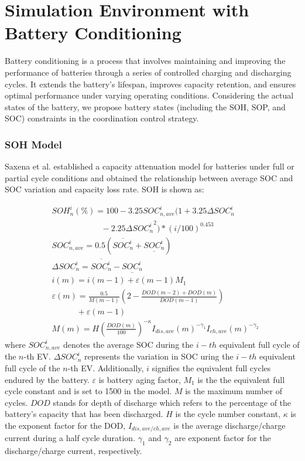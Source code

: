 \documentclass[journal,twoside]{IEEEtran}
\begin{document}
\appendices
\section{Simulation Environment with Battery Conditioning}
Battery conditioning is a process that involves maintaining and improving the performance of batteries through a series of controlled charging and discharging cycles. It extends the battery's lifespan, improves capacity retention, and ensures optimal performance under varying operating conditions. Considering the actual states of the battery, we propose battery states (including the SOH, SOP, and SOC) constraints in the coordination control strategy.
\subsubsection{SOH Model}
Saxena et al.\cite{saxena2016cycle} established a capacity attenuation model for batteries under full or partial cycle conditions and obtained the relationship between average SOC and SOC variation and capacity loss rate. SOH is shown as:

\begin{align}
&SOH^i_n(\%)=100 - 3.25{SOC_{n,ave}^i}(1+3.25\Delta SOC_n^i\nonumber\\
&\qquad \qquad \qquad-2.25{\Delta SOC_n^i}^2)*(i/100)^{0.453}\\
&{SOC_{n,ave}^i}=0.5(\overline{SOC_n^i}+\underline{SOC_n^i})\\
&\Delta SOC_n^i=\overline{SOC_n^i}-\underline{SOC_n^i}\\
&i(m)=i(m-1)+\varepsilon (m-1) M_1\\
&\varepsilon (m)=\frac{0.5}{M(m-1)} (2-\frac{DOD(m-2)+DOD(m)}{DOD(m-1)})\nonumber\\
&\qquad \quad +\varepsilon (m-1)\\
&M(m)=H{{(\frac{DOD(m)}{100})}^{-\kappa }} {{I}_{dis,ave}}{{(m)}^{-{{\gamma }_{1}}}} {{I}_{ch,ave}}{{(m)}^{-{{\gamma }_{2}}}}
\end{align}
where $SOC_{n,ave}^i$ denotes the average SOC during the $i-{th}$ equivalent full cycle of the $n$-th EV. $\Delta SOC_n^i$ represents the variation in SOC uring the $i-{th}$ equivalent full cycle of the $n$-th EV. Additionally, $i$ signifies the equivalent full cycles endured by the battery. $\varepsilon$ is battery aging factor, $M_1$ is the the equivalent full cycle constant and is set to 1500 in the model. $M$ is the maximum number of cycles. $DOD$ stands for depth of discharge which refers to the percentage of the battery's capacity that has been discharged. $H$ is the cycle number constant, $\kappa$ is the exponent factor for the DOD, ${I}_{{dis,ave}/{ch,ave}}$ is the average discharge/charge current during a half cycle duration. ${\gamma }_{1}$ and ${\gamma }_{2}$ are exponent factor for the discharge/charge current, respectively. 
\end{document}
